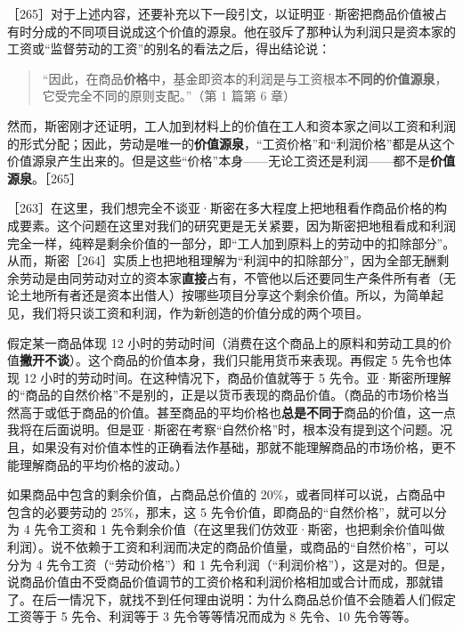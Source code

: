 ［265］\fontbox{~\{}对于上述内容，还要补充以下一段引文，以证明亚·斯密把商品价值被占有时分成的不同项目说成这个价值的源泉。他在驳斥了那种认为利润只是资本家的工资或“监督劳动的工资”的别名的看法之后，得出结论说：

\begin{quote}“因此，在商品\textbf{价格}中，基金即资本的利润是与工资根本\textbf{不同的价值源泉}，它受完全不同的原则支配。”（第 1 篇第 6 章）\end{quote}

然而，斯密刚才还证明，工人加到材料上的价值在工人和资本家之间以工资和利润的形式分配；因此，劳动是唯一的\textbf{价值源泉}，“工资价格”和“利润价格”都是从这个价值源泉产生出来的。但是这些“价格”本身——无论工资还是利润——都不是\textbf{价值源泉}。\fontbox{\}~}［265］


［263］在这里，我们想完全不谈亚·斯密在多大程度上把地租看作商品价格的构成要素。这个问题在这里对我们的研究更是无关紧要，因为斯密把地租看成和利润完全一样，纯粹是剩余价值的一部分，即“工人加到原料上的劳动中的扣除部分”。从而，斯密［264］实质上也把地租理解为“利润中的扣除部分”，因为全部无酬剩余劳动是由同劳动对立的资本家\textbf{直接}占有，不管他以后还要同生产条件所有者（无论土地所有者还是资本出借人）按哪些项目分享这个剩余价值。所以，为简单起见，我们将只谈工资和利润，作为新创造的价值分成的两个项目。

假定某一商品体现 12 小时的劳动时间（消费在这个商品上的原料和劳动工具的价值\textbf{撇开不谈}）。这个商品的价值本身，我们只能用货币来表现。再假定 5 先令也体现 12 小时的劳动时间。在这种情况下，商品价值就等于 5 先令。亚·斯密所理解的“商品的自然价格”不是别的，正是以货币表现的商品价值。（商品的市场价格当然高于或低于商品的价值。甚至商品的平均价格也\textbf{总是不同于}商品的价值，这一点我将在后面说明。但是亚·斯密在考察“自然价格”时，根本没有提到这个问题。况且，如果没有对价值本性的正确看法作基础，那就不能理解商品的市场价格，更不能理解商品的平均价格的波动。）

如果商品中包含的剩余价值，占商品总价值的 20\%，或者同样可以说，占商品中包含的必要劳动的 25\%，那末，这 5 先令价值，即商品的“自然价格”，就可以分为 4 先令工资和 1 先令剩余价值（在这里我们仿效亚·斯密，也把剩余价值叫做利润）。说不依赖于工资和利润而决定的商品价值量，或商品的“自然价格”，可以分为 4 先令工资（“劳动价格”）和 1 先令利润（“利润价格”），这是对的。但是，说商品价值由不受商品价值调节的工资价格和利润价格相加或合计而成，那就错了。在后一情况下，就找不到任何理由说明：为什么商品总价值不会随着人们假定工资等于 5 先令、利润等于 3 先令等等情况而成为 8 先令、10 先令等等。

